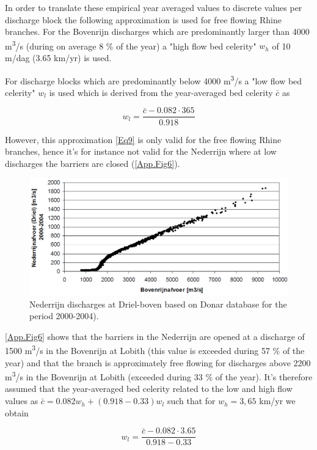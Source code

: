 In order to translate these empirical year averaged values to discrete values per discharge block the following approximation is used for free flowing Rhine branches.
For the Bovenrijn discharges which are predominantly larger than 4000 m\textsuperscript{3}/s (during on average 8 \% of the year) a "high flow bed celerity" $w_h$ of 10 m/dag (3.65 km/yr) is used.

For discharge blocks which are predominantly below 4000 m\textsuperscript{3}/s a "low flow bed celerity" $w_l$ is used which is derived from the year-averaged bed celerity $\bar{c}$ as

\begin{equation}
w_l = \frac{\bar{c} - 0.082 \cdot 365}{0.918}
\label{Eq9}
\end{equation}

However, this approximation \autoref{Eq9} is only valid for the free flowing Rhine branches, hence it's for instance not valid for the Nederrijn where at low discharges the barriers are closed (\autoref{App.Fig6}).

\begin{figure}
\includegraphics[width=\columnwidth]{figures/Fig6.png}
\caption{Nederrijn discharges at Driel-boven based on Donar database for the period 2000-2004).}
\label{App.Fig6}
\end{figure}

\autoref{App.Fig6} shows that the barriers in the Nederrijn are opened at a discharge of 1500 m\textsuperscript{3}/s in the Bovenrijn at Lobith (this value is exceeded during 57 \% of the year) and that the branch is approximately free flowing for discharges above 2200 m\textsuperscript{3}/s in the Bovenrijn at Lobith (exceeded during 33 \% of the year).
It's therefore assumed that the year-averaged bed celerity related to the low and high flow values as $\bar{c} = 0.082 w_h + (0.918 - 0.33) w_l$ such that for $w_h = 3,65$ km/yr we obtain

\begin{equation}
w_l = \frac{\bar{c} - 0.082 \cdot 3.65}{0.918 - 0.33}
\label{Eq10a}
\end{equation}

